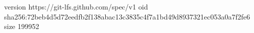 version https://git-lfs.github.com/spec/v1
oid sha256:72beb4d5d72eedfb2f138abac13c3835c4f7a1bd49d8937321ec053a0a7f2fe6
size 199952

